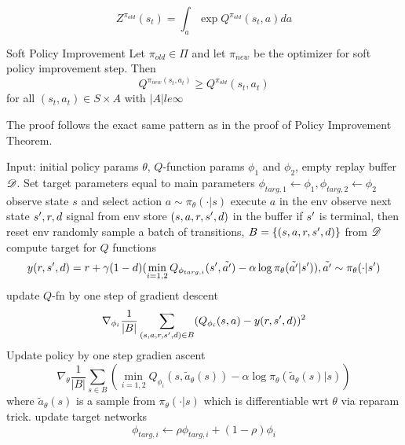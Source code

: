 \documentclass{article}
\begin{document}
\[
    Z^{\pi_{old}}(s_t)=\int_{a} \exp{Q^{\pi_{old}}(s_t, a)} da
\]

\begin{lemma}{Soft Policy Improvement}
    Let $\pi_{old}\in \Pi$ and let $\pi_{new}$ be the optimizer for 
    soft policy improvement step. Then 
    \[
        Q^{\pi_{new}(s_t, a_t)} \geq Q^{\pi_{old}}(s_t, a_t)
    \]
    for all $(s_t, a_t) \in S\times A$ with $|A| le \infty$
\end{lemma}

The proof follows the exact same pattern as in the proof of Policy
Improvement Theorem. 


\begin{algorithm}[H]
\caption{Soft Actor-Critic}
\label{alg}
\end{algorithm}

\begin{algorithmic}
\STATE Input: initial policy params $\theta$, $Q$-function params 
$\phi_1$ and $\phi_2$, empty replay buffer $\mathscr{D}$.
\STATE Set target parameters equal to main parameters 
    $\phi_{targ,1}\leftarrow \phi_1, \phi_{targ,2}\leftarrow \phi_2$
\REPEAT
    \STATE observe state $s$ and select action 
    $a\sim\pi_{\theta}(\cdot|s)$
    \STATE execute $a$ in the env
    \STATE observe next state $s^{\prime}, r, d$ signal from env
    \STATE store $(s,a,r,s^{\prime},d)$ in the buffer
    \STATE if $s^{\prime}$ is terminal, then reset env
            \STATE randomly sample a batch of transitions, 
            $B=\{(s,a,r,s^{\prime},d)\}$ from $\mathscr{D}$
            \STATE compute target for $Q$ functions
            \[
                y(r,s^{\prime},d) = r + \gamma(1-d)(\min_{i=1,2}
                Q_{\phi_{targ,i}}(s^{\prime},\tilde{a^{\prime}})
                - \alpha \log \pi_{\theta}(\tilde{a^{\prime}}|s^{\prime})),
                \tilde {a^{\prime}} \sim \pi_{\theta}(\cdot|s^{\prime})
            \]
            \STATE update $Q$-fn by one step of gradient descent
            \[
                \nabla_{\phi_i}\frac{1}{|B|}
                \sum_{(s,a,r,s^{\prime},d)\in B}
                (Q_{\phi_i}(s,a) - y(r,s^{\prime},d))^2
            \]
            \STATE Update policy by one step gradien ascent
            \[
                \nabla_{\theta}\frac{1}{|B|}
                \sum_{s\in B}(\min_{i=1,2}
                Q_{\phi_i}(s,\tilde a_{\theta}(s)) - 
                \alpha\log\pi_{\theta}(\tilde a_{\theta}(s)|s))
            \]
            where $\tilde a_{\theta}(s)$ is a sample from
            $\pi_{\theta}(\cdot|s)$ which is differentiable wrt $\theta$
            via reparam trick.
            \STATE update target networks
            \[
                \phi_{targ,i}\leftarrow \rho\phi_{targ,i} + 
                (1-\rho)\phi_i
            \]
        \ENDFOR
    \ENDIF
{}
\end{algorithmic}
\end{document}
